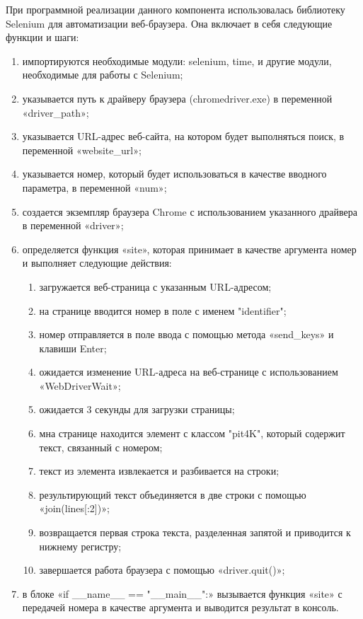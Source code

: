 При программной реализации данного компонента использовалась библиотеку Selenium для автоматизации веб-браузера. Она включает в себя следующие функции и шаги:
\begin{enumerate}
    \item импортируются необходимые модули: selenium, time, и другие модули, необходимые для работы с Selenium;
    \item указывается путь к драйверу браузера (chromedriver.exe) в переменной «driver\_path»;
    \item указывается URL-адрес веб-сайта, на котором будет выполняться поиск, в переменной «website\_url»;
    \item указывается номер, который будет использоваться в качестве вводного параметра, в переменной «num»;
    \item создается экземпляр браузера Chrome с использованием указанного драйвера в переменной «driver»;
    \item ­определяется функция «site», которая принимает в качестве аргумента номер и выполняет следующие действия:
        \begin{enumerate}
            \item загружается веб-страница с указанным URL-адресом;
            \item на странице вводится номер в поле с именем "identifier";
            \item номер отправляется в поле ввода с помощью метода «send\_keys» и клавиши Enter;
            \item ожидается изменение URL-адреса на веб-странице с использованием «WebDriverWait»;
            \item ожидается 3 секунды для загрузки страницы;
            \item мна странице находится элемент с классом "pit4K", который содержит текст, связанный с номером;
            \item текст из элемента извлекается и разбивается на строки;
            \item результирующий текст объединяется в две строки с помощью «join(lines[:2])»;
            \item возвращается первая строка текста, разделенная запятой и приводится к нижнему регистру;
            \item завершается работа браузера с помощью «driver.quit()»;
        \end{enumerate}
        \item в блоке «if \_\_name\_\_ == "\_\_main\_\_":» вызывается функция «site» с передачей номера в качестве аргумента и выводится результат в консоль.
    \end{enumerate}

